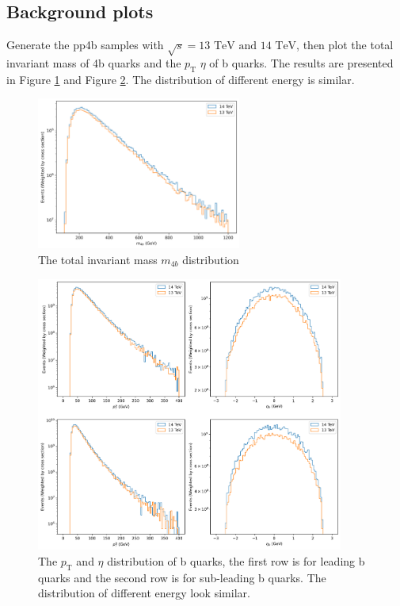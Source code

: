 \documentclass[12pt]{article}
\begin{document}
	\subsection{Background plots}%
	\label{sub:background_plots}
	Generate the pp4b samples with $\sqrt{s} = \text{13 TeV and 14 TeV}$, then plot the total invariant mass of 4b quarks and the $p_{\text{T}}$ $\eta$ of b quarks. The results are presented in Figure \ref{fig:pp4b-m4b-13-14TeV} and Figure \ref{fig:pp4b-pt-eta-13-14TeV}. The distribution of different energy is similar.
		\begin{figure}[htpb]
			\centering
			\includegraphics[width=0.6\textwidth]{pp4b-m4b-13-14TeV.png}
			\caption{The total invariant mass $m_{4b}$ distribution}
			\label{fig:pp4b-m4b-13-14TeV}
		\end{figure}

		\begin{figure}[htpb]
			\centering
			\includegraphics[width=0.9\textwidth]{pp4b-pt-eta-13-14TeV.png}
			\caption{The $p_{\text{T}}$ and $\eta$ distribution of b quarks, the first row is for leading b quarks and the second row is for sub-leading b quarks. The distribution of different energy look similar.}
			\label{fig:pp4b-pt-eta-13-14TeV}
		\end{figure}
\end{document}
